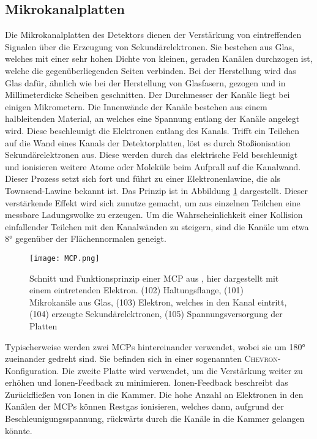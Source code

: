 \subsection{Mikrokanalplatten}
Die Mikrokanalplatten des Detektors dienen der Verstärkung von eintreffenden Signalen über die Erzeugung von Sekundärelektronen. Sie bestehen aus Glas, welches mit einer sehr hohen Dichte von kleinen, geraden Kanälen durchzogen ist, welche die gegenüberliegenden Seiten verbinden. Bei der Herstellung wird das Glas dafür, ähnlich wie bei der Herstellung von Glasfasern, gezogen und in Millimeterdicke Scheiben geschnitten. Der Durchmesser der Kanäle liegt bei einigen Mikrometern. Die Innenwände der Kanäle bestehen aus einem halbleitenden Material, an welches eine Spannung entlang der Kanäle angelegt wird. Diese beschleunigt die Elektronen entlang des Kanals. Trifft ein Teilchen auf die Wand eines Kanals der Detektorplatten, löst es durch Stoßionisation Sekundärelektronen aus. Diese werden durch das elektrische Feld beschleunigt und ionisieren weitere Atome oder Moleküle beim Aufprall auf die Kanalwand. Dieser Prozess setzt sich fort und führt zu einer Elektronenlawine, die als Townsend-Lawine bekannt ist. Das Prinzip ist in Abbildung \ref{fig:MCP} dargestellt. Dieser verstärkende Effekt wird sich zunutze gemacht, um aus einzelnen Teilchen eine messbare Ladungswolke zu erzeugen. Um die Wahrscheinlichkeit einer Kollision einfallender Teilchen mit den Kanalwänden zu steigern, sind die Kanäle um etwa \ang{8} gegenüber der Flächennormalen geneigt. 

\begin{figure}
    \centering
    \texttt{[image: MCP.png]}
    \caption[Schnitt und Funktionsprinzip einer MCP]{Schnitt und Funktionsprinzip einer MCP aus \cite{MCP}, hier dargestellt mit einem eintretenden Elektron. (102) Haltungsflange, (101) Mikrokanäle aus Glas, (103) Elektron, welches in den Kanal eintritt, (104) erzeugte Sekundärelektronen, (105) Spannungsversorgung der Platten}
    \label{fig:MCP} 
\end{figure}

Typischerweise werden zwei MCPs hintereinander verwendet, wobei sie um \ang{180} zueinander gedreht sind. Sie befinden sich in einer sogenannten \textsc{Chevron}-Konfiguration. Die zweite Platte wird verwendet, um die Verstärkung weiter zu erhöhen und Ionen-Feedback zu minimieren. Ionen-Feedback beschreibt das Zurückfließen von Ionen in die Kammer. Die hohe Anzahl an Elektronen in den Kanälen der MCPs können Restgas ionisieren, welches dann, aufgrund der Beschleunigungsspannung, rückwärts durch die Kanäle in die Kammer gelangen könnte. 

